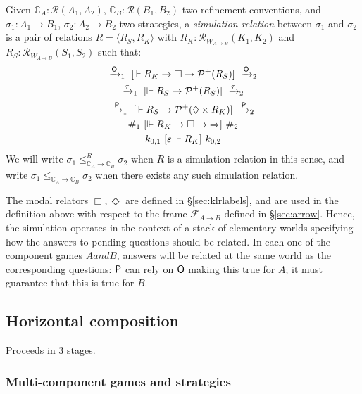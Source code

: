 \begin{definition}
Given
$\mathbb{C}_A : \mathcal{R}(A_1, A_2)$,
$\mathbb{C}_B : \mathcal{R}(B_1, B_2)$
two refinement conventions, and
$\sigma_1 : A_1 \rightarrow B_1$,
$\sigma_2 : A_2 \rightarrow B_2$
two strategies,
a \emph{simulation relation} between $\sigma_1$ and $\sigma_2$
is a pair of relations $R = \langle R_S, R_K \rangle$ with
$R_K : \mathcal{R}_{W_{\!A \rightarrow B}}(K_1, K_2)$ and
$R_S : \mathcal{R}_{W_{\!A \rightarrow B}}(S_1, S_2)$
such that:
\begin{gather*}
  \xrightarrow{ \mathsf{O} }_1
  \ [{\Vdash R_K \rightarrow \Box \rightarrow \mathcal{P}^+(R_S)}]\ 
  \xrightarrow{ \mathsf{O} }_2
  \\
  \xrightarrow{\tau}_1
  \ [{\Vdash R_S \rightarrow \mathcal{P}^+(R_S)}]\ 
  \xrightarrow{\tau}_2
  \\
  \xrightarrow{ \mathsf{P} }_1
  \ [{\Vdash R_S \rightarrow \mathcal{P}^+(\Diamond \times R_K)}]\ 
  \xrightarrow{ \mathsf{P} }_2
  \\
  \#_1
  \ [{\Vdash R_K \rightarrow \Box \rightarrow {\Rightarrow}}]\ 
  \#_2
  \\
  k_{0,1} \ [{\varepsilon \Vdash R_K}]\  k_{0,2}
\end{gather*}
We will write
$\sigma_1 \le_{\mathbb{C}_A \rightarrow \mathbb{C}_B}^R \sigma_2$
when $R$ is a simulation relation in this sense, and write
$\sigma_1 \le_{\mathbb{C}_A \rightarrow \mathbb{C}_B} \sigma_2$
when there exists any such simulation relation.
\end{definition}

The modal relators $\Box, \Diamond$ are defined in \S\ref{sec:klrlabels},
and are used in the definition above
with respect to the frame $\mathcal{F}_{A \rightarrow B}$
defined in \S\ref{sec:arrow}.
Hence, the simulation operates in the context of
a stack of elementary worlds
specifying how the answers to pending questions
should be related.
In each one of the component games $A and B$,
answers will be related at the same world as the corresponding questions:
$ \mathsf{P} $ can rely on $ \mathsf{O} $ making this true for $A$;
it must guarantee that this is true for $B$.

\subsection{Horizontal composition}

Proceeds in 3 stages.

\subsubsection{Multi-component games and strategies}

